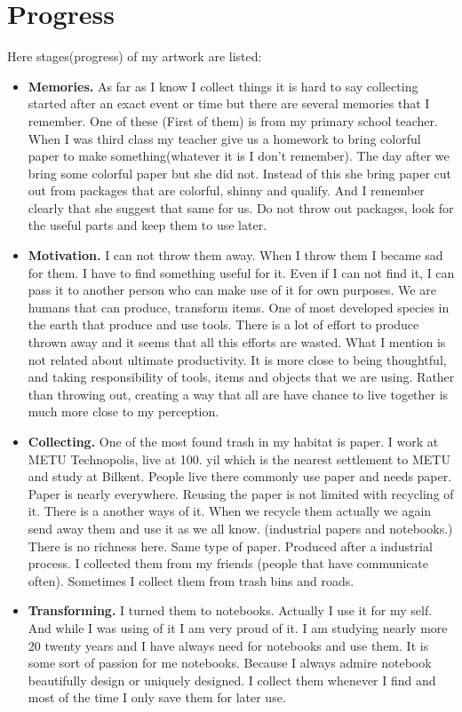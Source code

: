 
\section{Progress}
Here stages(progress) of my artwork are listed:

\begin{itemize}
\item \textbf{Memories.} As far as I know I collect things it is hard to say collecting started after an exact event or time but there are several memories that I remember. One of these (First of them) is from my primary school teacher. When I was third class my teacher give us a homework to bring colorful paper to make something(whatever it is I don't remember). The day after we bring some colorful paper but she did not. Instead of this she bring paper cut out from packages that are colorful, shinny and qualify. And I remember clearly that she suggest that same for us. Do not throw out packages, look for the useful parts and keep them to use later. 
\item \textbf{Motivation.} I can not throw them away. When I throw them I became sad for them. I have to find something useful for it. Even if I can not find it, I can pass it to another person who can make use of it for own purposes. We are humans that can produce, transform items. One of most developed species in the earth that produce and use tools. There is a lot of effort to produce thrown away and it seems that all this efforts are wasted. What I mention is not related about ultimate productivity. It is more close to being thoughtful, and taking responsibility of tools, items and objects that we are using. Rather than throwing out, creating a way that all are have chance to live together is much more close to my perception. 
\item \textbf{Collecting.} One of the most found trash in my habitat is paper. I work at METU Technopolis, live at 100. yil which is the nearest settlement to METU and study at Bilkent. People live there commonly use paper and needs paper. Paper is nearly everywhere. Reusing the paper is not limited with recycling of it. There is a another ways of it. When we recycle them actually we again send away them and use it as we all know. (industrial papers and notebooks.) There is no richness here. Same type of paper. Produced after a industrial process. I collected them from my friends (people that have communicate often). Sometimes I collect them from trash bins and roads. 
\item \textbf{Transforming.} I turned them to notebooks. Actually I use it for my self. And while I was using of it I am very proud of it. I am studying nearly more 20 twenty years and I have always need for notebooks and use them. It is some sort of passion for me notebooks. Because I always admire notebook beautifully design or uniquely designed. I collect them whenever I find and most of the time I only save them for later use. 
\end{itemize}

